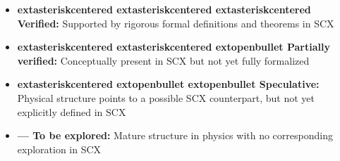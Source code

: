 \documentclass[12pt,a4paper]{article}
\theoremstyle{remark}
\begin{document}
\begin{itemize}
    \item \textbf{	extasteriskcentered	extasteriskcentered	extasteriskcentered Verified:} Supported by rigorous formal definitions and theorems in SCX
    \item \textbf{	extasteriskcentered	extasteriskcentered	extopenbullet Partially verified:} Conceptually present in SCX but not yet fully formalized
    \item \textbf{	extasteriskcentered	extopenbullet	extopenbullet Speculative:} Physical structure points to a possible SCX counterpart, but not yet explicitly defined in SCX
    \item \textbf{— To be explored:} Mature structure in physics with no corresponding exploration in SCX
\end{itemize}
\end{document}
